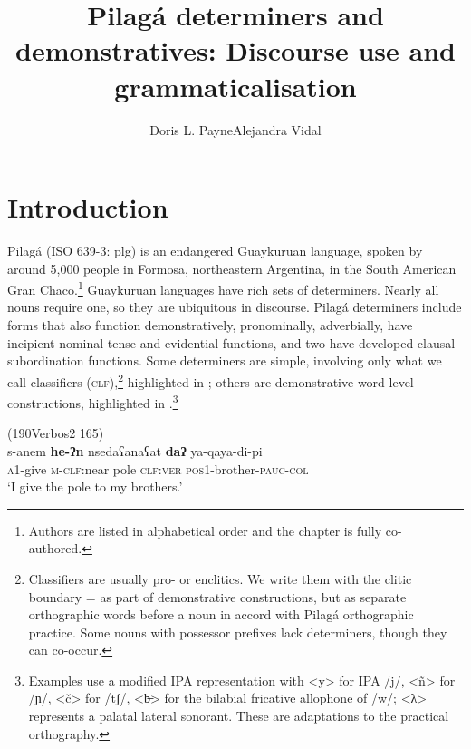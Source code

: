 \documentclass[output=paper,colorlinks,citecolor=brown]{langscibook}
\author{Doris L. Payne\affiliation{University of Oregon \& SIL International}\orcid{}\lastand Alejandra Vidal\affiliation{Universidad Formosa \& CONICET}\orcid{}}
\title{Pilagá determiners and demonstratives: Discourse use and grammaticalisation}
\begin{document}
\maketitle 
{}


\section{Introduction}\label{sec:payne:1}

Pilagá (ISO 639-3: plg) is an endangered Guaykuruan language, spoken by around 5,000 people in Formosa, northeastern Argentina, in the South American Gran Chaco.\footnote{Authors are listed in alphabetical order and the chapter is fully co-authored.} Guaykuruan languages have rich sets of determiners. Nearly all nouns require one, so they are ubiquitous in discourse. Pilagá determiners include forms that also function demonstratively, pronominally, adverbially, have incipient nominal tense and evidential functions, and two have developed clausal subordination functions. Some determiners are simple, involving only what we call classifiers (\textsc{clf}),\footnote{Classifiers are usually pro- or enclitics. We write them with the clitic boundary = as part of demonstrative constructions, but as separate orthographic words before a noun in accord with Pilagá orthographic practice. Some nouns with possessor prefixes lack determiners, though they can co-occur.} highlighted in ; others are demonstrative word-level constructions, highlighted in .\footnote{Examples use a modified IPA representation with <y> for IPA /j/, <ñ> for /ɲ/, <č> for /tʃ/, <\textrm{b̶}> for the bilabial fricative allophone of /w/; <λ> represents a palatal lateral sonorant. These are adaptations to the practical orthography.}

\ea\label{ex:payne:1} (190Verbos2 165)\footnotemark{}\\
\gll  s-anem  \textbf{he-ʔn}  nsedaʕanaʕat  \textbf{daʔ}  ya-qaya-di-pi\\
 \textsc{a1}-give \textsc{m-clf}:near  pole \textsc{clf:ver} \textsc{pos1}-brother-\textsc{pauc-col}\\
\glt ‘I give the pole to my brothers.’ 
\z
{}
\end{document}
